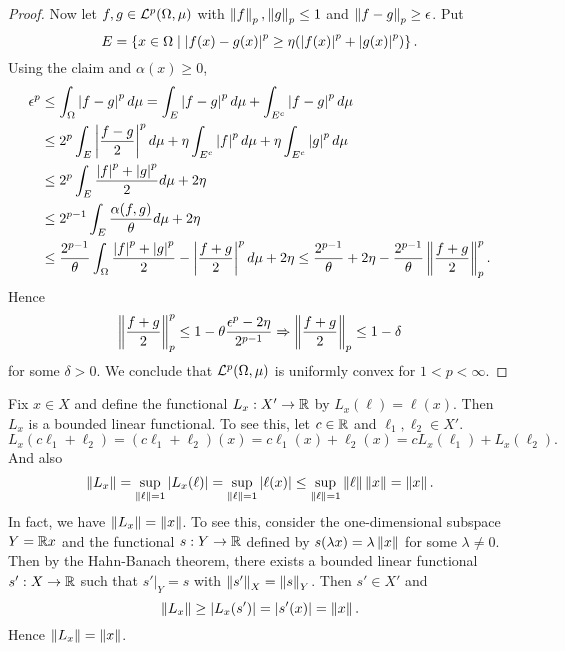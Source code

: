 \begin{proof}
    Now let $f,g\in\mathcal{L}^p(\Omega,\mu)$ with $\left\lVert {f} \right\rVert_p,\left\lVert {g} \right\rVert_p\leq 1$ 
    and $\left\lVert {f-g} \right\rVert_p\geq \epsilon$. Put 
    \begin{equation*}
        E = \left\{ x\in\Omega \;\middle\vert\; \left\lvert {f(x)-g(x)} \right\rvert^p \geq \eta(\left\lvert {f(x)} \right\rvert^p + \left\lvert {g(x)} \right\rvert^p) \right\}.
    \end{equation*}
    Using the claim and $\alpha(x)\geq 0$,
    \begin{equation*}
        \begin{split}
            \epsilon^p &\leq \int_\Omega \left\lvert {f-g} \right\rvert^pd\mu 
            = \int_E \left\lvert {f-g} \right\rvert^pd\mu + \int_{E^c} \left\lvert {f-g} \right\rvert^pd\mu \\ 
            &\leq 2^p\int_E \left\lvert {\frac{f-g}{2}} \right\rvert^pd\mu + \eta\int_{E^c} \left\lvert {f} \right\rvert^pd\mu + \eta\int_{E^c} \left\lvert {g} \right\rvert^pd\mu \\
            &\leq 2^p\int_E \frac{\left\lvert {f} \right\rvert^p+\left\lvert {g} \right\rvert^p}{2}d\mu + 2\eta \\
            &\leq 2^{p-1}\int_E \frac{\alpha(f,g)}{\theta}d\mu + 2\eta \\
            &\leq \frac{2^{p-1}}{\theta}\int_\Omega \frac{\left\lvert {f} \right\rvert^p + \left\lvert {g} \right\rvert^p}{2} - \left\lvert {\frac{f+g}{2}} \right\rvert^pd\mu + 2\eta 
            \leq \frac{2^{p-1}}{\theta} + 2\eta - \frac{2^{p-1}}{\theta}\left\lVert {\frac{f+g}{2}} \right\rVert_p^p.
        \end{split}
    \end{equation*}
    Hence 
    \begin{equation*}
        \left\lVert {\frac{f+g}{2}} \right\rVert_p^p \leq 1 - \theta\frac{\epsilon^p-2\eta}{2^{p-1}} 
        \Rightarrow \left\lVert {\frac{f+g}{2}} \right\rVert_p \leq 1 - \delta
    \end{equation*}
    for some $\delta>0$. We conclude that $\mathcal{L}^p(\Omega,\mu)$ is uniformly convex 
    for $1<p<\infty$.
\end{proof}

\begin{example}
    Fix $x\in X$ and define the functional $L_x:X'\to\mathbb{R}$ by 
    $L_x(\ell) = \ell(x)$. Then $L_x$ is a bounded linear functional. 
    To see this, let $c\in\mathbb{R}$ and $\ell_1,\ell_2\in X'$. 
    \begin{equation*}
        L_x(c\ell_1 + \ell_2) = (c\ell_1 + \ell_2)(x) = c\ell_1(x) + \ell_2(x) 
        = cL_x(\ell_1) + L_x(\ell_2).
    \end{equation*} 
    And also
    \begin{equation*}
        \left\lVert {L_x} \right\rVert = \sup_{\left\lVert {\ell} \right\rVert=1}\left\lvert {L_x(\ell)} \right\rvert 
        = \sup_{\left\lVert {\ell} \right\rVert=1}\left\lvert {\ell(x)} \right\rvert \leq \sup_{\left\lVert {\ell} \right\rVert=1}\left\lVert {\ell} \right\rVert\left\lVert {x} \right\rVert 
        = \left\lVert {x} \right\rVert.
    \end{equation*}
    In fact, we have $\left\lVert {L_x} \right\rVert = \left\lVert {x} \right\rVert$. To see this, consider 
    the one-dimensional subspace $Y = \mathbb{R} x$ and the functional 
    $s:Y\to\mathbb{R}$ defined by $s(\lambda x) = \lambda\left\lVert {x} \right\rVert$ for some 
    $\lambda\neq 0$. Then by the Hahn-Banach theorem, there exists a 
    bounded linear functional $s':X\to\mathbb{R}$ such that $s'|_Y = s$ with 
    $\left\lVert {s'} \right\rVert_X = \left\lVert {s} \right\rVert_Y$. Then $s'\in X'$ and 
    \begin{equation*}
        \left\lVert {L_x} \right\rVert \geq \left\lvert {L_x(s')} \right\rvert = \left\lvert {s'(x)} \right\rvert = \left\lVert {x} \right\rVert.
    \end{equation*} 
    Hence $\left\lVert {L_x} \right\rVert = \left\lVert {x} \right\rVert$. 
\end{example}


